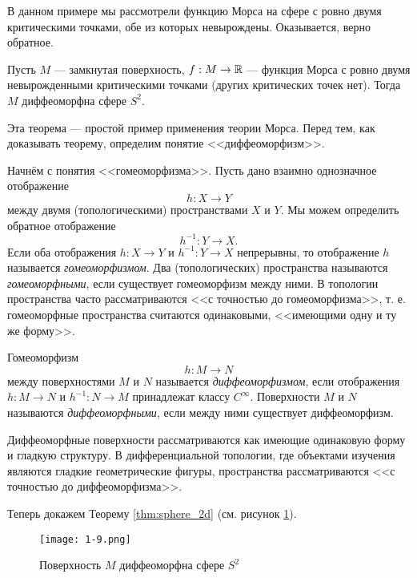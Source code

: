 \documentclass[a4paper,12pt,openany,leqno]{extbook}
\begin{document}
В данном примере мы рассмотрели функцию Морса на сфере с ровно двумя критическими точками, обе из которых невырождены. Оказывается, верно обратное.

\begin{theorem}
Пусть $M$ --- замкнутая поверхность, $f:M\to\mathbb{R}$ --- функция Морса с ровно двумя невырожденными критическими точками (других критических точек нет). Тогда $M$ диффеоморфна сфере $S^2$.
\label{thm:sphere_2d}
\end{theorem}

Эта теорема --- простой пример применения теории Морса. Перед тем, как доказывать теорему, определим понятие <<диффеоморфизм>>.

Начнём с понятия <<гомеоморфизма>>. Пусть дано взаимно однозначное отображение
\[
h: X \to Y
\]
между двумя (топологическими) пространствами $X$ и $Y$. Мы можем определить обратное отображение
\[
h^{-1}: Y \to X.
\]
Если оба отображения $h: X \to Y$ и $h^{-1}: Y \to X$ непрерывны, то отображение $h$ называется \emph{гомеоморфизмом}. Два (топологических) пространства называются \emph{гомеоморфными}, если существует гомеоморфизм между ними. В топологии пространства часто рассматриваются <<с точностью до гомеоморфизма>>, т. е. гомеоморфные пространства считаются одинаковыми, <<имеющими одну и ту же форму>>.

\begin{definition}
Гомеоморфизм
\[
h:M\to N
\]
между поверхностями $M$ и $N$ называется \emph{диффеоморфизмом}, если отображения $h: M \to N$ и $h^{-1}: N \to M$ принадлежат классу $C^{\infty}$. Поверхности $M$ и $N$ называются \emph{диффеоморфными}, если между ними существует диффеоморфизм.
\end{definition}

Диффеоморфные поверхности рассматриваются как имеющие одинаковую форму и гладкую структуру. В дифференциальной топологии, где объектами изучения являются гладкие геометрические фигуры, пространства рассматриваются <<с точностью до диффеоморфизма>>.

Теперь докажем Теорему \ref{thm:sphere_2d} (см. рисунок \ref{fig:diffeomorphic}).

\begin{figure}[ht]
\texttt{[image: 1-9.png]}
\caption{Поверхность $M$ диффеоморфна сфере $S^2$}
\label{fig:diffeomorphic}
\end{figure}
\end{document}
